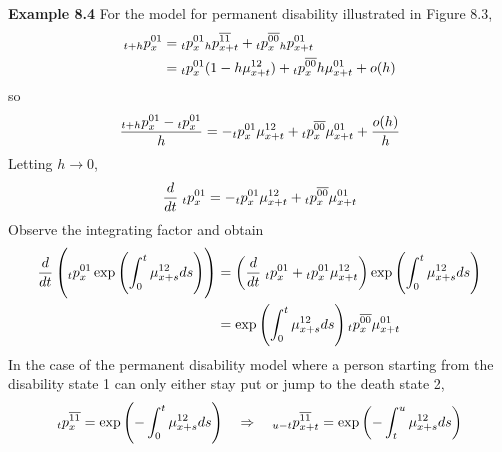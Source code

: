 \documentclass[hidelinks, 12pt]{article}
\theoremstyle{mydefstyle}
\theoremstyle{mythmstyle}
\begin{document}
\textbf{Example 8.4} For the model for permanent disability illustrated in Figure 8.3,
\begin{align*}
\hspace{0mm}_{t+h}p_x^{01}
&= \hspace{0mm}_tp_x^{01} \hspace{0mm}_hp_{x+t}^{\overline{11}}
+ \hspace{0mm}_tp_x^{\overline{00}} \hspace{0mm}_hp_{x+t}^{01} \\
&= \hspace{0mm}_tp_x^{01} (1 - h\mu_{x+t}^{12})
+ \hspace{0mm}_tp_x^{\overline{00}} h\mu_{x+t}^{01} + o(h)
\end{align*}
so
\begin{gather*}
\frac{\hspace{0mm}_{t+h}p_x^{01} - \hspace{0mm}_tp_x^{01}}{h}
= -\hspace{0mm}_tp_x^{01} \mu_{x+t}^{12} + \hspace{0mm}_tp_x^{\overline{00}} \mu_{x+t}^{01} + \frac{o(h)}{h}
\end{gather*}
Letting $h \to 0$, 
\begin{gather*}
\frac{d}{dt} \hspace{1mm}_tp_x^{01} = -\hspace{0mm}_tp_x^{01} \mu_{x+t}^{12} + \hspace{0mm}_tp_x^{\overline{00}} \mu_{x+t}^{01}
\end{gather*}
Observe the integrating factor and obtain
\begin{align*}
\frac{d}{dt} \left( \hspace{0mm}_tp_x^{01} \exp \left( \int_0^t \mu_{x+s}^{12} ds \right) \right)
&= \left( \frac{d}{dt} \hspace{1mm}_tp_x^{01} + \hspace{0mm}_tp_x^{01} \mu_{x+t}^{12} \right) \exp \left( \int_0^t \mu_{x+s}^{12} ds \right) \\ &= \exp \left( \int_0^t \mu_{x+s}^{12} ds \right) \hspace{0mm}_tp_x^{\overline{00}} \mu_{x+t}^{01}
\end{align*}
In the case of the permanent disability model where a person starting from the disability state 1 can only either stay put or jump to the death state 2,
\begin{gather*}
\hspace{0mm}_tp_x^{\overline{11}} = \exp \left( - \int_0^t \mu_{x+s}^{12} ds \right) \quad\Rightarrow\quad
\hspace{0mm}_{u-t}p_{x+t}^{\overline{11}} = \exp \left( - \int_t^u \mu_{x+s}^{12} ds \right)
\end{gather*}
\end{document}
